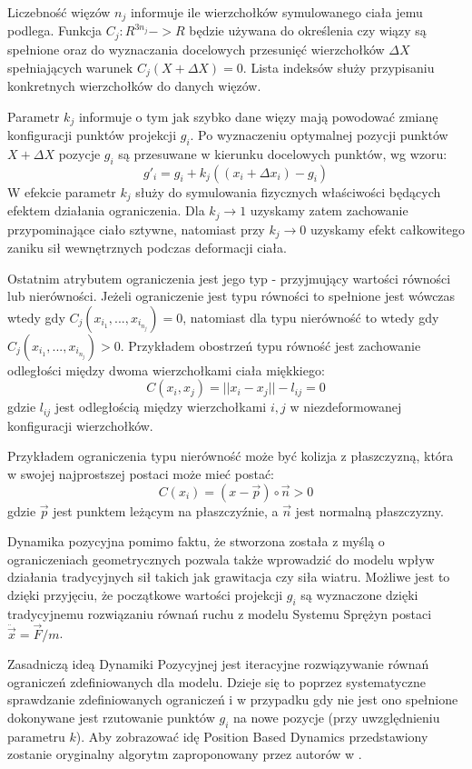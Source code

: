 \raggedright
Liczebność więzów $n_j$ informuje ile wierzchołków symulowanego ciała 
jemu podlega. Funkcja $C_j : R^{3n_j} -> R$ będzie używana do
określenia czy wiązy są spełnione oraz do wyznaczania docelowych
przesunięć wierzchołków $\Delta X$ spełniających warunek $C_j(X + \Delta X) = 0$. 
Lista indeksów służy przypisaniu konkretnych wierzchołków do danych
więzów.

Parametr $k_j$ informuje o tym jak szybko dane więzy mają
powodować zmianę konfiguracji punktów projekcji $g_i$. Po wyznaczeniu
optymalnej pozycji punktów $X + \Delta X$ pozycje $g_i$ są przesuwane w kierunku
docelowych punktów, wg wzoru:
$$g'_i = g_i + k_j ((x_i + \Delta x_i) - g_i)$$
W efekcie parametr $k_j$ służy do symulowania fizycznych właściwości
będących efektem działania ograniczenia. Dla $k_j \to 1$ uzyskamy zatem
zachowanie przypominające ciało sztywne, natomiast przy $k_j \to 0$ uzyskamy
efekt całkowitego zaniku sił wewnętrznych podczas deformacji ciała.

Ostatnim atrybutem ograniczenia jest jego typ - przyjmujący wartości równości lub
nierówności. Jeżeli ograniczenie jest typu równości to spełnione jest wówczas
wtedy gdy $C_j(x_{i_1},..., x_{i_{n_j}}) = 0$, natomiast dla typu nierówność to
wtedy gdy $C_j(x_{i_1},..., x_{i_{n_j}}) > 0$.
Przykładem obostrzeń typu równość jest zachowanie odległości między dwoma
wierzchołkami ciała miękkiego:
\begin{equation}
C(x_i, x_j) = || x_i - x_j || - l_{ij} = 0
\end{equation}
gdzie $l_{ij}$ jest odległością między wierzchołkami $i, j$ w niezdeformowanej
konfiguracji wierzchołków.

Przykładem ograniczenia typu nierówność może być kolizja z płaszczyzną, która
w swojej najprostszej postaci może mieć postać:
\begin{equation}
C(x_i) = (x - \vec{p}) \circ \vec{n} > 0
\end{equation}
gdzie $\vec{p}$ jest punktem leżącym na płaszczyźnie, a $\vec{n}$ jest normalną
płaszczyzny.

Dynamika pozycyjna pomimo faktu, że stworzona została z myślą o ograniczeniach
geometrycznych pozwala także wprowadzić do modelu wpływ działania tradycyjnych sił takich jak grawitacja
czy siła wiatru. Możliwe jest to dzięki przyjęciu, że początkowe wartości
projekcji $g_i$ są wyznaczone dzięki tradycyjnemu rozwiązaniu równań ruchu z
modelu Systemu Sprężyn postaci $\ddot{\vec{x}} = \vec{F} / m$.

Zasadniczą ideą Dynamiki Pozycyjnej jest iteracyjne rozwiązywanie
równań ograniczeń zdefiniowanych dla modelu.
Dzieje się to poprzez systematyczne sprawdzanie zdefiniowanych ograniczeń i w
przypadku gdy nie jest ono spełnione dokonywane jest rzutowanie punktów $g_i$ na
nowe pozycje (przy uwzględnieniu parametru $k$). Aby zobrazować idę
Position Based Dynamics przedstawiony zostanie oryginalny algorytm zaproponowany
przez autorów w \cite{pbdyn}.

